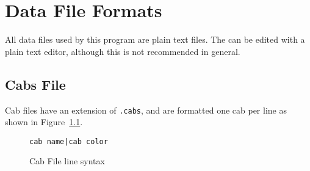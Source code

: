 
\chapter{Data File Formats}
\label{chapt:Files}

All data files used by this program are plain text files.  The can be
edited with a plain text editor, although this is not recommended in
general.

\section{Cabs File}

Cab files have an extension of \verb=.cabs=, and are formatted one cab
per line as shown in Figure~\ref{fig:cabfile}.

\begin{figure}
\begin{centering}
\verb=cab name|cab color=\\
\caption{Cab File line syntax}
\label{fig:cabfile}
\end{centering}
\end{figure}

